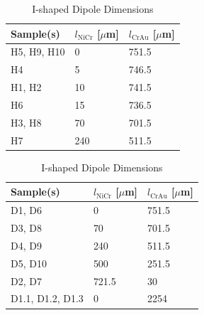 \begin{table}[!]
    \centering
    \begin{minipage}{0.45\textwidth}
        \centering
        \begin{tabular}{l|l|l}
        \toprule
        Sample(s) & $l_{\text{NiCr}}$ [$\mu$m] & $l_{\text{CrAu}}$ [$\mu$m] \\
        \midrule
        H5, H9, H10 & 0 & 751.5 \\
        H4 & 5 & 746.5 \\
        H1, H2 & 10 & 741.5 \\
        H6 & 15 & 736.5 \\
        H3, H8 & 70 & 701.5 \\
        H7 & 240 & 511.5 \\
        \bottomrule
        \end{tabular}
        \caption{\centering H-Dipole Dimensions}
        \label{tab:h-dipole}
    \end{minipage}
    \hspace{0.05\textwidth} %
    \begin{minipage}{0.45\textwidth}
        \centering
        \begin{tabular}{l|l|l}
        \toprule
        Sample(s) & $l_{\text{NiCr}}$ [$\mu$m] & $l_{\text{CrAu}}$ [$\mu$m] \\
        \midrule
        D1, D6 & 0 & 751.5 \\
        D3, D8 & 70 & 701.5 \\
        D4, D9 & 240 & 511.5 \\
        D5, D10 & 500 & 251.5 \\
        D2, D7 & 721.5 & 30 \\
        D1.1, D1.2, D1.3 & 0 & 2254 \\
        \bottomrule
        \end{tabular}
        \caption{\centering I-shaped Dipole Dimensions}
        \label{tab:i-dipole}
    \end{minipage}
\end{table}

